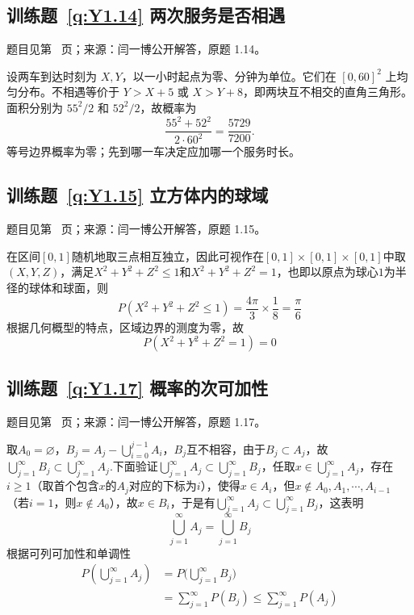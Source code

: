\documentclass[UTF8,12pt,a4paper,fontset=fandol]{ctexbook}
\begin{document}
\subsection*{训练题~\ref{q:Y1.14} 两次服务是否相遇}\label{a:Y1.14}{\small 题目见第~\pageref{q:Y1.14} 页；来源：闫一博公开解答，原题 1.14。}
\begin{solve}设两车到达时刻为 $X,Y$，以一小时起点为零、分钟为单位。它们在 $[0,60]^2$ 上均匀分布。不相遇等价于 $Y>X+5$ 或 $X>Y+8$，即两块互不相交的直角三角形。面积分别为 $55^2/2$ 和 $52^2/2$，故概率为\[\frac{55^2+52^2}{2\cdot60^2}=\frac{5729}{7200}.\]等号边界概率为零；先到哪一车决定应加哪一个服务时长。\end{solve}

\subsection*{训练题~\ref{q:Y1.15} 立方体内的球域}\label{a:Y1.15}{\small 题目见第~\pageref{q:Y1.15} 页；来源：闫一博公开解答，原题 1.15。}
\begin{solve}
  在区间$[0,1]$随机地取三点相互独立，因此可视作在$[0,1]\times [0,1]\times [0,1]$中取$(X,Y,Z)$，满足$X^2+Y^2+Z^2\leqslant 1$和$X^2+Y^2+Z^2=1$，也即以原点为球心$1$为半径的球体和球面，则
\[
P(X^2+Y^2+Z^2\leqslant 1)=\frac{4\pi}{3}\times\frac{1}{8}=\frac{\pi}{6}
\]
根据几何概型的特点，区域边界的测度为零，故
\[
P(X^2+Y^2+Z^2=1)=0
\]  
\end{solve}

\subsection*{训练题~\ref{q:Y1.17} 概率的次可加性}\label{a:Y1.17}{\small 题目见第~\pageref{q:Y1.17} 页；来源：闫一博公开解答，原题 1.17。}
\begin{solve}
取$A_0=\varnothing$，${B_j} = {A_j} - \bigcup\limits_{i = 0}^{j - 1} {{A_i}} $，$B_j$互不相容，由于$B_j\subset A_j$，故$ \bigcup\limits_{j = 1}^\infty  {{B_j}}  \subset \bigcup\limits_{j = 1}^\infty  {{A_j}} $.下面验证$ \bigcup\limits_{j = 1}^\infty  {{A_j}}  \subset \bigcup\limits_{j = 1}^\infty  {{B_j}} $，任取$x\in \bigcup\limits_{j = 1}^\infty  {{A_j}}$，存在$i\geqslant 1$（取首个包含$x$的$A_j$对应的下标为$i$），使得$x\in A_i$，但$x\notin A_0,A_1,\cdots,A_{i-1}$（若$i=1$，则$x\notin A_0$），故$x\in B_i$，于是有$ \bigcup\limits_{j = 1}^\infty  {{A_j}}  \subset \bigcup\limits_{j = 1}^\infty  {{B_j}} $，这表明
\[\bigcup\limits_{j = 1}^\infty  {{A_j}}  = \bigcup\limits_{j = 1}^\infty  {{B_j}}\] 根据可列可加性和单调性
\[\begin{aligned}
P(\bigcup\limits_{j = 1}^\infty  {{A_j}} ) &= P(\bigcup\limits_{j = 1}^\infty  {{B_j})}  \\&= \sum\limits_{j = 1}^\infty  {P({B_j})}  \leqslant \sum\limits_{j = 1}^\infty  {P({A_j})} 
\end{aligned}\]
\end{solve}
\end{document}
